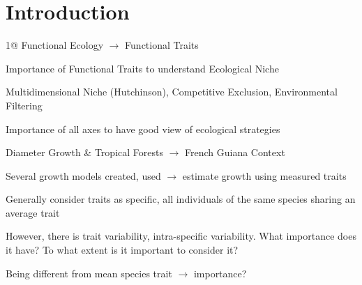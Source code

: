 \label{sec:Intro}
\section*{Introduction}
1@
Functional Ecology $\rightarrow$ Functional Traits

Importance of Functional Traits to understand Ecological Niche

Multidimensional Niche (Hutchinson), Competitive Exclusion, Environmental Filtering

Importance of all axes to have good view of ecological strategies

Diameter Growth \& Tropical Forests $\rightarrow$ French Guiana Context

Several growth models created, used $\rightarrow$ estimate growth using measured traits

Generally consider traits as specific, all individuals of the same species sharing an average trait

However, there is trait variability, intra-specific variability. What importance does it have? To what extent is it important to consider it? 

Being different from mean species trait $\rightarrow$ importance?

